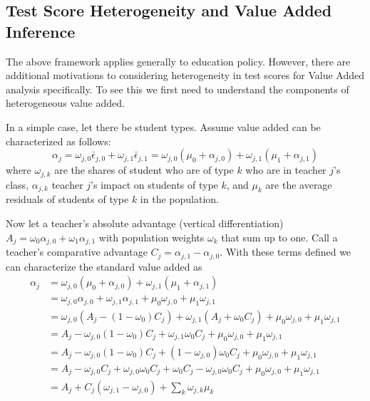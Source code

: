 \documentclass{article}
\theoremstyle{definition}
\theoremstyle{definition}
\theoremstyle{definition}
\theoremstyle{definition}
\begin{document}
   \subsection{Test Score Heterogeneity and Value Added Inference}
   \label{va_hetero}
   
   The above framework applies generally to education policy. However, there are additional motivations to considering heterogeneity in test scores for Value Added analysis specifically. To see this we first need to understand the components of heterogeneous value added. 
   
    In a simple case, let there be student types. Assume value added can be characterized as follows:
    \[
    \alpha_j = \omega_{j,0}\bar{\epsilon}_{j,0}  + \omega_{j,1}\bar{\epsilon}_{j,1} =  \omega_{j,0}(\mu_0 +\alpha_{j,0}) + \omega_{j,1}(\mu_1 +\alpha_{j,1})
    \]
    \noindent where $\omega_{j,k}$ are the shares of student who are of type $k$ who are in teacher $j$'s class, $\alpha_{j,k}$ teacher $j$'s  impact on students of type $k$, and $\mu_k$ are the average residuals of students of type $k$ in the population.
    
    Now let a teacher's absolute advantage (vertical differentiation) $A_j = \omega_{0}\alpha_{j,0} + \omega_{1}\alpha_{j,1}$ with population  weights $\omega_{k}$ that sum up to one. Call a teacher's comparative advantage $C_j = \alpha_{j,1} - \alpha_{j,0}$. With these terms defined we can characterize the standard value added as
    \begin{align*}
        \alpha_j  &= \omega_{j,0}(\mu_0 +\alpha_{j,0}) + \omega_{j,1}(\mu_1 +\alpha_{j,1})  \\
                  & =  \omega_{j,0}\alpha_{j,0} + \omega_{j,1}\alpha_{j,1}   +\mu_0 \omega_{j,0} + \mu_1 \omega_{j,1}  \\
                  & =  \omega_{j,0}(A_j -(1-\omega_{0})C_j) + \omega_{j,1}(A_j +\omega_{0}C_j)  +\mu_0 \omega_{j,0} + \mu_1 \omega_{j,1} \\
                  & =  A_j   - \omega_{j,0} (1-\omega_{0})C_j + \omega_{j,1}\omega_{0}C_j +\mu_0 \omega_{j,0} + \mu_1 \omega_{j,1} \\
                  & =  A_j   - \omega_{j,0} (1-\omega_{0})C_j + (1-\omega_{j,0})\omega_{0}C_j +\mu_0 \omega_{j,0} + \mu_1 \omega_{j,1} \\
                  & =  A_j   - \omega_{j,0} C_j +\omega_{j,0}\omega_{0}C_j + \omega_{0}C_j -\omega_{j,0}\omega_{0}C_j +\mu_0 \omega_{j,0} + \mu_1 \omega_{j,1} \\
                  & =  A_j  + C_j  ( \omega_{j,1} - \omega_{j,0} ) + \sum_k  \omega_{j,k} \mu_k
    \end{align*}
    
\end{document}
